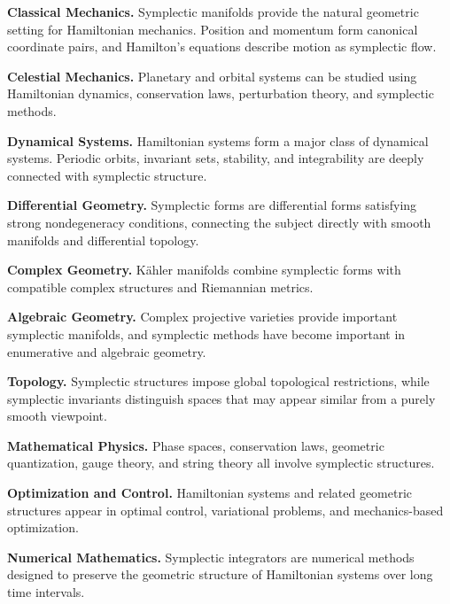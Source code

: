 \begin{applicationbox}
\textbf{Classical Mechanics.}
Symplectic manifolds provide the natural geometric setting for Hamiltonian
mechanics. Position and momentum form canonical coordinate pairs, and
Hamilton's equations describe motion as symplectic flow.

\medskip

\textbf{Celestial Mechanics.}
Planetary and orbital systems can be studied using Hamiltonian dynamics,
conservation laws, perturbation theory, and symplectic methods.

\medskip

\textbf{Dynamical Systems.}
Hamiltonian systems form a major class of dynamical systems. Periodic
orbits, invariant sets, stability, and integrability are deeply connected
with symplectic structure.

\medskip

\textbf{Differential Geometry.}
Symplectic forms are differential forms satisfying strong nondegeneracy
conditions, connecting the subject directly with smooth manifolds and
differential topology.

\medskip

\textbf{Complex Geometry.}
K\"ahler manifolds combine symplectic forms with compatible complex
structures and Riemannian metrics.

\medskip

\textbf{Algebraic Geometry.}
Complex projective varieties provide important symplectic manifolds, and
symplectic methods have become important in enumerative and algebraic
geometry.

\medskip

\textbf{Topology.}
Symplectic structures impose global topological restrictions, while
symplectic invariants distinguish spaces that may appear similar from a
purely smooth viewpoint.

\medskip

\textbf{Mathematical Physics.}
Phase spaces, conservation laws, geometric quantization, gauge theory, and
string theory all involve symplectic structures.

\medskip

\textbf{Optimization and Control.}
Hamiltonian systems and related geometric structures appear in optimal
control, variational problems, and mechanics-based optimization.

\medskip

\textbf{Numerical Mathematics.}
Symplectic integrators are numerical methods designed to preserve the
geometric structure of Hamiltonian systems over long time intervals.
\end{applicationbox}

